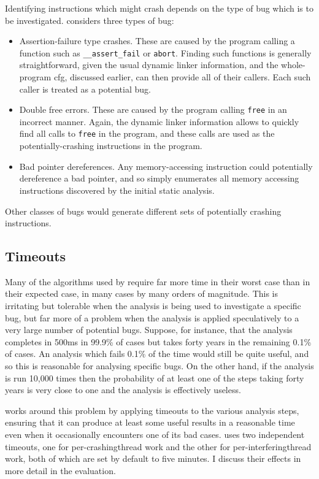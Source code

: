 Identifying instructions which might crash depends on the type of bug
which is to be investigated.  {\Implementation} considers three types
of bug:
\begin{itemize}
\item Assertion-failure type crashes.  These are caused by the program
  calling a function such as \verb|__assert_fail| or \verb|abort|.
  Finding such functions is generally straightforward, given the usual
  dynamic linker information, and the whole-program \gls{cfg},
  discussed earlier, can then provide all of their callers.  Each such
  caller is treated as a potential bug.
\item Double free errors.  These are caused by the program calling
  \verb|free| in an incorrect manner.  Again, the dynamic linker
  information allows {\implementation} to quickly find all calls to
  \verb|free| in the program, and these calls are used as the
  potentially-crashing instructions in the program.
\item Bad pointer dereferences.  Any memory-accessing instruction
  could potentially dereference a bad pointer, and so
  {\implementation} simply enumerates all memory accessing
  instructions discovered by the initial static analysis.
\end{itemize}
Other classes of bugs would generate different sets of potentially
crashing instructions.

\subsection{Timeouts}

Many of the algorithms used by {\technique} require far more time in
their worst case than in their expected case, in many cases by many
orders of magnitude.  This is irritating but tolerable when the
analysis is being used to investigate a specific bug, but far more of
a problem when the analysis is applied speculatively to a very large
number of potential bugs.  Suppose, for instance, that the analysis
completes in 500ms in 99.9\% of cases but takes forty years in the
remaining 0.1\% of cases.  An analysis which fails 0.1\% of the time
would still be quite useful, and so this is reasonable for analysing
specific bugs.  On the other hand, if the analysis is run 10,000 times
then the probability of at least one of the steps taking forty years
is very close to one and the analysis is effectively useless.

{\Technique} works around this problem by applying timeouts to the
various analysis steps, ensuring that it can produce at least some
useful results in a reasonable time even when it occasionally
encounters one of its bad cases.  {\Implementation} uses two
independent timeouts, one for per-\gls{crashingthread} work and the
other for per-\gls{interferingthread} work, both of which are set by
default to five minutes.  I discuss their effects in more detail in
the evaluation.

